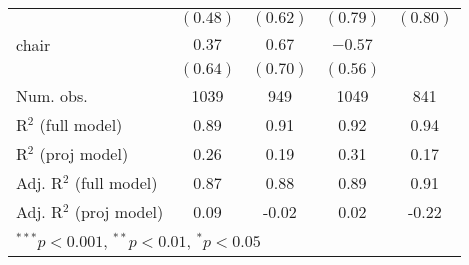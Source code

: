 \documentclass[12pt]{article}
\begin{document}
\begin{table}
\begin{center}
\begin{tabular}{l c c c c }
			& $(0.48)$      & $(0.62)$      & $(0.79)$      & $(0.80)$     \\
			chair                   & $0.37$        & $0.67$        & $-0.57$       &              \\
			& $(0.64)$      & $(0.70)$      & $(0.56)$      &              \\
			\hline
			Num. obs.               & 1039          & 949           & 1049          & 841          \\
			R$^2$ (full model)      & 0.89          & 0.91          & 0.92          & 0.94         \\
			R$^2$ (proj model)      & 0.26          & 0.19          & 0.31          & 0.17         \\
			Adj. R$^2$ (full model) & 0.87          & 0.88          & 0.89          & 0.91         \\
			Adj. R$^2$ (proj model) & 0.09          & -0.02         & 0.02          & -0.22        \\
			\hline
			\multicolumn{5}{l}{\scriptsize{$^{***}p<0.001$, $^{**}p<0.01$, $^*p<0.05$}}
		\end{tabular}
	\end{center}
\end{table}
\end{document}
